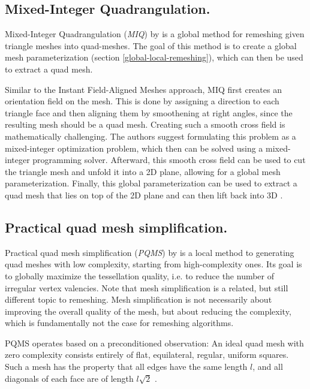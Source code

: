 \documentclass{ACGSeminar}
\begin{document}
\subsection*{Mixed-Integer Quadrangulation.}\label{MIQ}
Mixed-Integer Quadrangulation (\textit{MIQ}) by \cite{bommes2009mixed} is a global method for remeshing given triangle meshes into quad-meshes. The goal of this method is to create a global mesh parameterization (section \ref{global-local-remeshing}), which can then be used to extract a quad mesh.\bigskip

Similar to the Instant Field-Aligned Meshes approach, MIQ first creates an orientation field on the mesh. This is done by assigning a direction to each triangle face and then aligning them by smoothening at right angles, since the resulting mesh should be a quad mesh. Creating such a smooth cross field is mathematically challenging. The authors suggest formulating this problem as a mixed-integer optimization problem, which then can be solved using a mixed-integer programming solver. Afterward, this smooth cross field can be used to cut the triangle mesh and unfold it into a 2D plane, allowing for a global mesh parameterization. Finally, this global parameterization can be used to extract a quad mesh that lies on top of the 2D plane and can then lift back into 3D \cite{bommes2009mixed,schmidt2014towards}.

\subsection*{Practical quad mesh simplification.}\label{PQMS}
Practical quad mesh simplification (\textit{PQMS}) by \cite{tarini2010practical} is a local method to generating quad meshes with low complexity, starting from high-complexity ones. Its goal is to globally maximize the tessellation quality, i.e. to reduce the number of irregular vertex valencies. Note that mesh simplification is a related, but still different topic to remeshing. Mesh simplification is not necessarily about improving the overall quality of the mesh, but about reducing the complexity, which is fundamentally not the case for remeshing algorithms.\bigskip

PQMS operates based on a preconditioned observation: An ideal quad mesh with  zero complexity consists entirely of flat, equilateral, regular, uniform squares. Such a mesh has the property that all edges have the same length $l$, and all diagonals of each face are of length $l \sqrt{2}$ \cite{tarini2010practical}.
\end{document}
